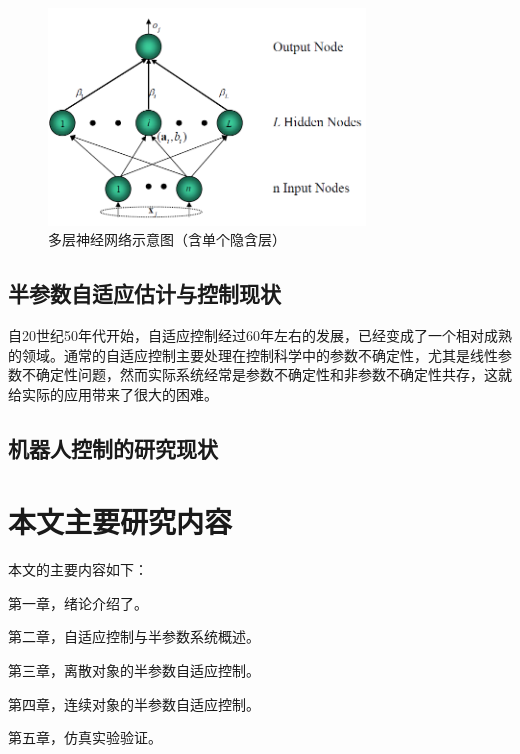 \begin{figure}
 \centering
 \includegraphics[width=0.75\textwidth]{figures/fig1}
 \caption{多层神经网络示意图（含单个隐含层）}\label{fig:MNN}
\end{figure}

\subsection{半参数自适应估计与控制现状}

自20世纪50年代开始，自适应控制经过60年左右的发展，已经变成了一个相对成熟的领域。通常的自适应控制主要处理在控制科学中的参数不确定性，尤其是线性参数不确定性问题，然而实际系统经常是参数不确定性和非参数不确定性共存，这就给实际的应用带来了很大的困难。

\subsection{机器人控制的研究现状}

\section{本文主要研究内容}
本文的主要内容如下：

第一章，绪论介绍了。

第二章，自适应控制与半参数系统概述。

第三章，离散对象的半参数自适应控制。

第四章，连续对象的半参数自适应控制。

第五章，仿真实验验证。